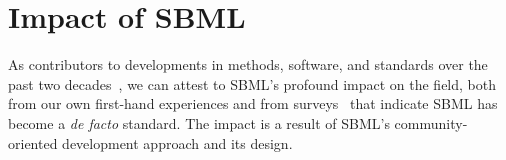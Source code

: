 \documentclass{sbml-paper}
\begin{document}






\section*{Impact of SBML}

As contributors to developments in methods, software, and standards over the past two decades~\citep{Hucka2015promotinga}, we can attest to SBML's profound impact on the field, both from our own first-hand experiences and from surveys~\citep{Klipp2007systems} that indicate SBML has become a \emph{de facto} standard.  The impact is a result of SBML's community-oriented development approach and its design.
\end{document}
